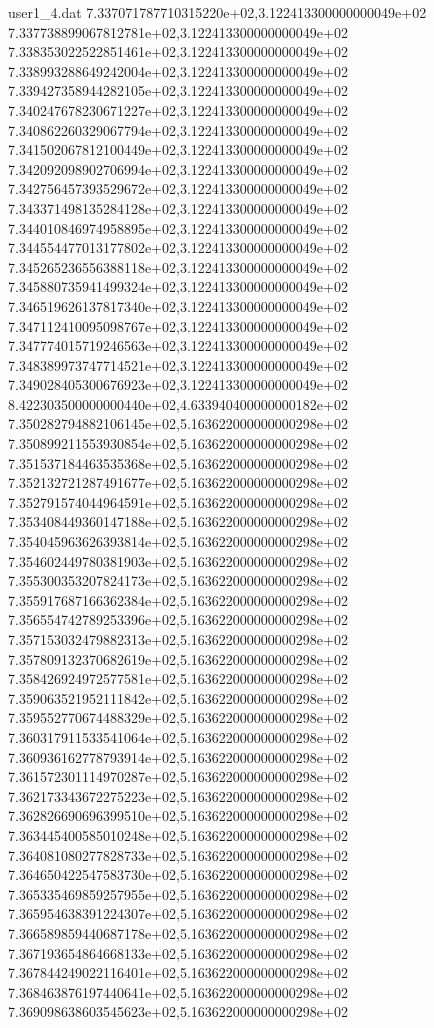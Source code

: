 \begin{filecontents}{user1_4.dat}
7.337071787710315220e+02,3.122413300000000049e+02
7.337738899067812781e+02,3.122413300000000049e+02
7.338353022522851461e+02,3.122413300000000049e+02
7.338993288649242004e+02,3.122413300000000049e+02
7.339427358944282105e+02,3.122413300000000049e+02
7.340247678230671227e+02,3.122413300000000049e+02
7.340862260329067794e+02,3.122413300000000049e+02
7.341502067812100449e+02,3.122413300000000049e+02
7.342092098902706994e+02,3.122413300000000049e+02
7.342756457393529672e+02,3.122413300000000049e+02
7.343371498135284128e+02,3.122413300000000049e+02
7.344010846974958895e+02,3.122413300000000049e+02
7.344554477013177802e+02,3.122413300000000049e+02
7.345265236556388118e+02,3.122413300000000049e+02
7.345880735941499324e+02,3.122413300000000049e+02
7.346519626137817340e+02,3.122413300000000049e+02
7.347112410095098767e+02,3.122413300000000049e+02
7.347774015719246563e+02,3.122413300000000049e+02
7.348389973747714521e+02,3.122413300000000049e+02
7.349028405300676923e+02,3.122413300000000049e+02
8.422303500000000440e+02,4.633940400000000182e+02
7.350282794882106145e+02,5.163622000000000298e+02
7.350899211553930854e+02,5.163622000000000298e+02
7.351537184463535368e+02,5.163622000000000298e+02
7.352132721287491677e+02,5.163622000000000298e+02
7.352791574044964591e+02,5.163622000000000298e+02
7.353408449360147188e+02,5.163622000000000298e+02
7.354045963626393814e+02,5.163622000000000298e+02
7.354602449780381903e+02,5.163622000000000298e+02
7.355300353207824173e+02,5.163622000000000298e+02
7.355917687166362384e+02,5.163622000000000298e+02
7.356554742789253396e+02,5.163622000000000298e+02
7.357153032479882313e+02,5.163622000000000298e+02
7.357809132370682619e+02,5.163622000000000298e+02
7.358426924972577581e+02,5.163622000000000298e+02
7.359063521952111842e+02,5.163622000000000298e+02
7.359552770674488329e+02,5.163622000000000298e+02
7.360317911533541064e+02,5.163622000000000298e+02
7.360936162778793914e+02,5.163622000000000298e+02
7.361572301114970287e+02,5.163622000000000298e+02
7.362173343672275223e+02,5.163622000000000298e+02
7.362826690696399510e+02,5.163622000000000298e+02
7.363445400585010248e+02,5.163622000000000298e+02
7.364081080277828733e+02,5.163622000000000298e+02
7.364650422547583730e+02,5.163622000000000298e+02
7.365335469859257955e+02,5.163622000000000298e+02
7.365954638391224307e+02,5.163622000000000298e+02
7.366589859440687178e+02,5.163622000000000298e+02
7.367193654864668133e+02,5.163622000000000298e+02
7.367844249022116401e+02,5.163622000000000298e+02
7.368463876197440641e+02,5.163622000000000298e+02
7.369098638603545623e+02,5.163622000000000298e+02

\end{filecontents}
